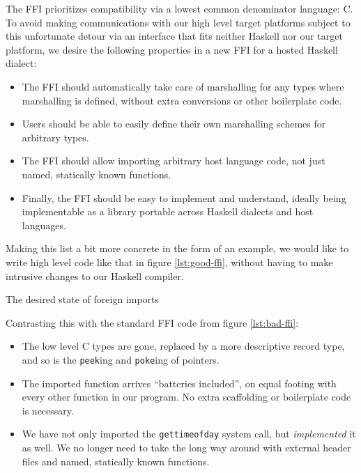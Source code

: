 \documentclass{sigplanconf}
\begin{document}
The FFI prioritizes compatibility via a lowest common denominator language: C.
To avoid making communications with our high level target platforms subject
to this unfortunate detour via an interface that fits neither Haskell nor
our target platform, we desire the following properties in a new FFI for a
hosted Haskell dialect:

\begin{itemize}
\item
  The FFI should automatically take care of marshalling for any types where
  marshalling is defined, without extra conversions or other boilerplate code.
\item
  Users should be able to easily define their own marshalling schemes for
  arbitrary types.
\item
  The FFI should allow importing arbitrary host language code, not just named,
  statically known functions.
\item
  Finally, the FFI should be easy to implement and understand, ideally being
  implementable as a library portable across Haskell dialects and host
  languages.
\end{itemize}

Making this list a bit more concrete in the form of an example, we would like
to write high level code like that in figure \ref{lst:good-ffi}, without
having to make intrusive changes to our Haskell compiler.

\begin{listingfloat}
\caption{The desired state of foreign imports}
\label{lst:good-ffi}
\end{listingfloat}

Contrasting this with the standard FFI code from figure \ref{lst:bad-ffi}:

\begin{itemize}
\item
  The low level C types are gone, replaced by a more descriptive record type,
  and so is the \lstinline!peek!ing and \lstinline!poke!ing of pointers.
\item
  The imported function arrives ``batteries included'', on equal footing with
  every other function in our program. No extra scaffolding or boilerplate
  code is necessary.
\item
  We have not only imported the \lstinline!gettimeofday! system call,
  but \emph{implemented} it as well.
  We no longer need to take the long way around with external header
  files and named, statically known functions.
\end{itemize}
\end{document}
